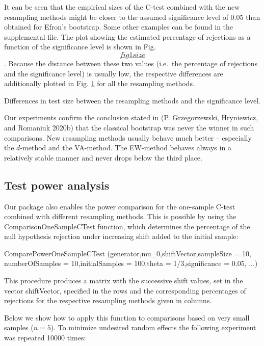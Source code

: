 It can be seen that the empirical sizes of the C-test combined with the
new resampling methods might be closer to the assumed significance level
of 0.05 than obtained for Efron's bootstrap. Some other examples can be
found in the supplemental file. The plot showing the estimated
percentage of rejections as a function of the significance level is
shown in Fig. \protect\hyperlink{fig1size}{\[fig1size\]}. Because the distance between these two values
(i.e.~the percentage of rejections and the significance level) is
usually low, the respective differences are additionally plotted in Fig.
\protect\hyperlink{fig2size}{1} for all the
resampling methods.

Differences in test size between the resampling methods and
the significance level.

Our experiments confirm the conclusion stated in
(P. Grzegorzewski, Hryniewicz, and Romaniuk 2020b) that the classical bootstrap was never the
winner in such comparisons. New resampling methods usually behave much
better -- especially the \(d\)-method and the VA-method. The EW-method
behaves always in a relatively stable manner and never drops below the
third place.

\hypertarget{test-power-analysis}{%
\subsection{Test power analysis}\label{test-power-analysis}}

Our package also enables the power comparison for the one-sample C-test
combined with different resampling methods. This is possible by using
the ComparisonOneSampleCTest function, which determines the percentage
of the null hypothesis rejection under increasing shift added to the
initial sample:

\begin{example}
ComparePowerOneSampleCTest (generator,mu\_0,shiftVector,sampleSize = 10,
numberOfSamples = 10,initialSamples = 100,theta = 1/3,significance =
0.05, ...)
\end{example}

This procedure produces a matrix with the successive shift values, set
in the vector shiftVector, specified in the rows and the corresponding
percentages of rejections for the respective resampling methods given in
columns.

Below we show how to apply this function to comparisons based on very
small samples (\(n=5\)). To minimize undesired random effects the
following experiment was repeated 10000 times:

